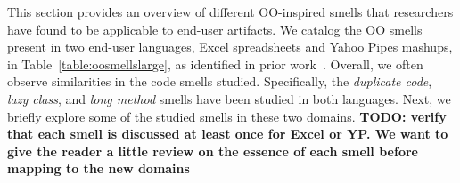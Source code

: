 \documentclass{sig-alternate}
\newcommand{\todo}[1]{\textbf{TODO: #1}}
\begin{document}
This section provides an overview of different OO-inspired smells that researchers have found to be applicable to end-user artifacts. 
 We catalog the OO smells present in two end-user languages, Excel spreadsheets and Yahoo Pipes mashups, in Table~\ref{table:oosmellslarge}, as identified in prior work~\cite{Stolee2011,StoleeTSE2013,Hermans2012intra, Hermans2012inter}.
 Overall, we often observe similarities in the code smells studied. Specifically, the \emph{duplicate code}, \emph{lazy class}, and \emph{long method} smells  have been studied in both languages. 
Next, we briefly explore some of the studied smells in these two domains.  \todo{verify that each smell is discussed at least once for Excel or YP. We want to give the reader a little review on the essence of each smell before mapping to the new domains}
\end{document}
